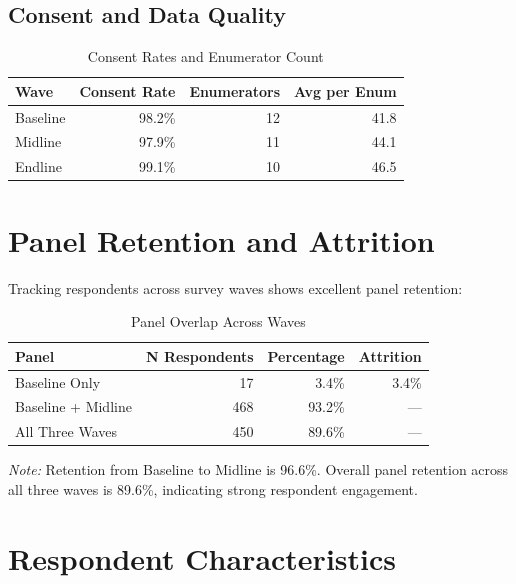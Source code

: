 \documentclass[11pt]{article}
\begin{document}
\subsection{Consent and Data Quality}

\begin{table}[h!]
\centering
\caption{Consent Rates and Enumerator Count}
\label{tab:consent}
\begin{tabularx}{0.8\textwidth}{lrrr}
\toprule
\textbf{Wave} & \textbf{Consent Rate} & \textbf{Enumerators} & \textbf{Avg per Enum} \\
\midrule
Baseline & 98.2\% & 12 & 41.8 \\
Midline & 97.9\% & 11 & 44.1 \\
Endline & 99.1\% & 10 & 46.5 \\
\bottomrule
\end{tabularx}
\end{table}

\section{Panel Retention and Attrition}

Tracking respondents across survey waves shows excellent panel retention:

\begin{table}[h!]
\centering
\caption{Panel Overlap Across Waves}
\label{tab:panel}
\begin{tabularx}{0.8\textwidth}{lrrr}
\toprule
\textbf{Panel} & \textbf{N Respondents} & \textbf{Percentage} & \textbf{Attrition} \\
\midrule
Baseline Only & 17 & 3.4\% & 3.4\% \\
Baseline + Midline & 468 & 93.2\% & --- \\
All Three Waves & 450 & 89.6\% & --- \\
\bottomrule
\end{tabularx}
\end{table}

\noindent \textit{Note:} Retention from Baseline to Midline is 96.6\%. Overall panel retention across all three waves is 89.6\%, indicating strong respondent engagement.

\section{Respondent Characteristics}
\end{document}

